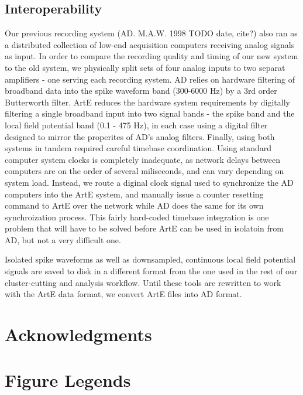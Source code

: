 \documentclass[10pt]{article}
\begin{document}
\subsection*{Interoperability}
Our previous recording system (AD. M.A.W. 1998 TODO date, cite?) also ran as a distributed collection of low-end acquisition computers receiving analog signals as input. In order to compare the recording quality and timing of our new system to the old system, we physically split sets of four analog inputs to two separat amplifiers - one serving each recording system. AD relies on hardware filtering of broadband data into the spike waveform band (300-6000 Hz) by a 3rd order Butterworth filter. ArtE reduces the hardware system requirements by digitally filtering a single broadband input into two signal bands - the spike band and the local field potential band (0.1 - 475 Hz), in each case using a digital filter designed to mirror the properites of AD's analog filters. Finally, using both systems in tandem required careful timebase coordination. Using standard computer system clocks is completely inadequate, as network delays between computers are on the order of several miliseconds, and can vary depending on system load. Instead, we route a diginal clock signal used to synchronize the AD computers into the ArtE system, and manually issue a counter resetting command to ArtE over the network while AD does the same for its own synchroization process. This fairly hard-coded timebase integration is one problem that will have to be solved before ArtE can be used in isolatoin from AD, but not a very difficult one.

Isolated spike waveforms as well as downsampled, continuous local field potential signals are saved to disk in a different format from the one used in the rest of our cluster-cutting and analysis workflow. Until these tools are rewritten to work with the ArtE data format, we convert ArtE files into AD format.

\section*{Acknowledgments}




\section*{Figure Legends}
\end{document}
